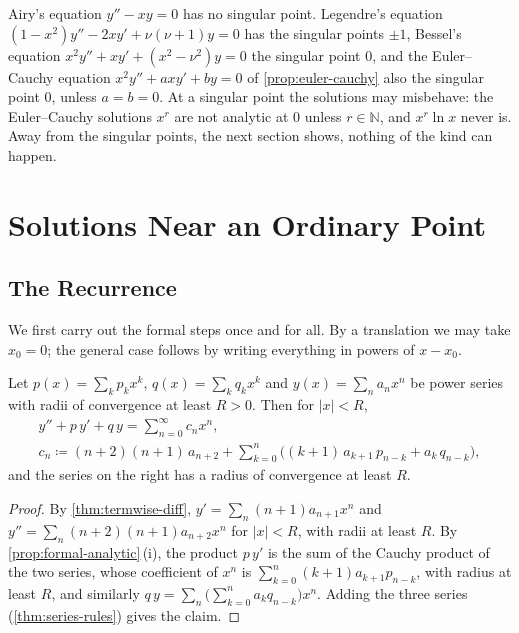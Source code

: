 Airy's equation $y''-xy=0$ has no singular point. Legendre's equation $(1-x^2)y''-2xy'+\nu(\nu+1)y=0$ has the singular points $\pm1$, Bessel's equation $x^2y''+xy'+(x^2-\nu^2)y=0$ the singular point $0$, and the Euler--Cauchy equation $x^2y''+axy'+by=0$ of \cref{prop:euler-cauchy} also the singular point $0$, unless $a=b=0$. At a singular point the solutions may misbehave: the Euler--Cauchy solutions $x^r$ are not analytic at $0$ unless $r\in\mathbb N$, and $x^r\ln x$ never is. Away from the singular points, the next section shows, nothing of the kind can happen.

\section{Solutions Near an Ordinary Point}
\label{sec:ordinary-points}

\subsection{The Recurrence}

We first carry out the formal steps once and for all. By a translation we may take $x_0=0$; the general case follows by writing everything in powers of $x-x_0$.

\begin{lemma}
\label{lem:series-substitution}
Let $p(x)=\sum_kp_kx^k$, $q(x)=\sum_kq_kx^k$ and $y(x)=\sum_na_nx^n$ be power series with radii of convergence at least $R>0$. Then for $|x|<R$,
\begin{gather*}
y''+p\,y'+q\,y=\sum_{n=0}^\infty c_nx^n,\\
c_n\coloneqq(n+2)(n+1)\,a_{n+2}+\sum_{k=0}^n\bigl((k+1)\,a_{k+1}\,p_{n-k}+a_k\,q_{n-k}\bigr),
\end{gather*}
and the series on the right has a radius of convergence at least $R$.
\end{lemma}

\begin{proof}
By \cref{thm:termwise-diff}, $y'=\sum_n(n+1)a_{n+1}x^n$ and $y''=\sum_n(n+2)(n+1)a_{n+2}x^n$ for $|x|<R$, with radii at least $R$. By \cref{prop:formal-analytic}\,(i), the product $p\,y'$ is the sum of the Cauchy product of the two series, whose coefficient of $x^n$ is $\sum_{k=0}^n(k+1)a_{k+1}p_{n-k}$, with radius at least $R$, and similarly $q\,y=\sum_n\bigl(\sum_{k=0}^na_kq_{n-k}\bigr)x^n$. Adding the three series (\cref{thm:series-rules}) gives the claim.
\end{proof}

